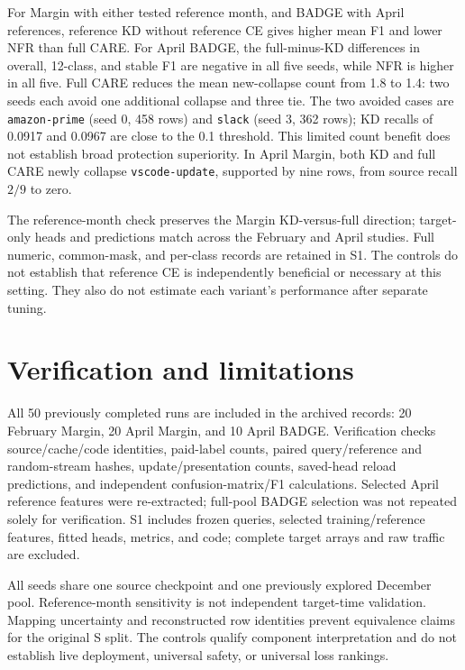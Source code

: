 \documentclass[11pt]{article}
\begin{document}
\FloatBarrier
For Margin with either tested reference month, and BADGE with April references, reference KD without reference CE gives higher mean F1 and lower NFR than full CARE. For April BADGE, the full-minus-KD differences in overall, 12-class, and stable F1 are negative in all five seeds, while NFR is higher in all five. Full CARE reduces the mean new-collapse count from 1.8 to 1.4: two seeds each avoid one additional collapse and three tie. The two avoided cases are \texttt{amazon-prime} (seed 0, 458 rows) and \texttt{slack} (seed 3, 362 rows); KD recalls of 0.0917 and 0.0967 are close to the 0.1 threshold. This limited count benefit does not establish broad protection superiority. In April Margin, both KD and full CARE newly collapse \texttt{vscode-update}, supported by nine rows, from source recall $2/9$ to zero.

The reference-month check preserves the Margin KD-versus-full direction; target-only heads and predictions match across the February and April studies. Full numeric, common-mask, and per-class records are retained in S1. The controls do not establish that reference CE is independently beneficial or necessary at this setting. They also do not estimate each variant's performance after separate tuning.

\section{Verification and limitations}
All 50 previously completed runs are included in the archived records: 20 February Margin, 20 April Margin, and 10 April BADGE. Verification checks source/cache/code identities, paid-label counts, paired query/reference and random-stream hashes, update/presentation counts, saved-head reload predictions, and independent confusion-matrix/F1 calculations. Selected April reference features were re-extracted; full-pool BADGE selection was not repeated solely for verification. S1 includes frozen queries, selected training/reference features, fitted heads, metrics, and code; complete target arrays and raw traffic are excluded.

All seeds share one source checkpoint and one previously explored December pool. Reference-month sensitivity is not independent target-time validation. Mapping uncertainty and reconstructed row identities prevent equivalence claims for the original S split. The controls qualify component interpretation and do not establish live deployment, universal safety, or universal loss rankings.
\end{document}
